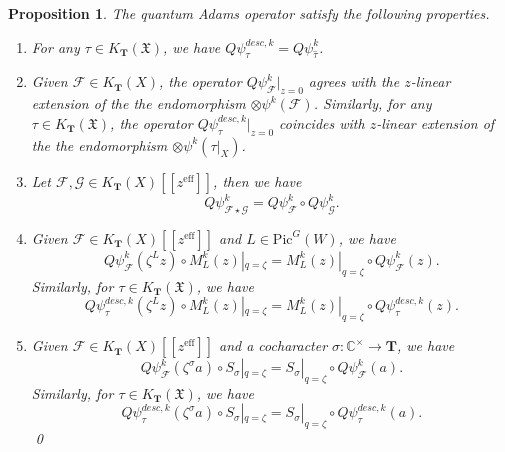 \documentclass[reqno]{amsart}
\numberwithin{equation}{section}
\numberwithin{equation}{section}
\numberwithin{equation}{section}
\newtheorem{prop}[thm]{Proposition}
\theoremstyle{definition}
\theoremstyle{remark}
\theoremstyle{remark}
\begin{document}
\begin{prop}\label{prop:adams-property}
     The quantum Adams operator satisfy the following properties.
    \begin{enumerate}
        \item For any $\tau \in K_{\mathbf{T}}(\mathfrak{X})$, we have $Q\psi_{\tau}^{desc,k} = Q\psi_{\hat{\tau}}^k$.
        \item Given $\mathcal{F} \in K_{\mathbf{T}}(X)$, the operator $Q\psi_{\mathcal{F}}^k|_{z=0}$ agrees with the $z$-linear extension of the the endomorphism $\otimes \psi^k(\mathcal{F})$. Similarly, for any $\tau \in K_{\mathbf{T}}(\mathfrak{X})$, the operator $Q\psi_{\tau}^{desc,k}|_{z=0}$ coincides with $z$-linear extension of the the endomorphism $\otimes \psi^k(\tau |_{X})$.
        \item Let $\mathcal{F}, \mathcal{G} \in K_{\mathbf{T}}(X)[\![ z^{\mathrm{eff}} ]\!]$, then we have
        \begin{equation}
        Q\psi^k_{\mathcal{F} \star \mathcal{G}} = Q\psi^k_{\mathcal{F}} \circ Q\psi^k_{\mathcal{G}}.
        \end{equation}
        \item Given $\mathcal{F} \in K_{\mathbf{T}}(X)[\![ z^{\mathrm{eff}} ]\!]$ and $L \in \mathrm{Pic}^G(W)$, we have
        \begin{equation}
            Q\psi^k_{\mathcal{F}}(\zeta^L z) \circ M_L^k(z)|_{q=\zeta} = M^k_L(z) |_{q=\zeta} \circ Q\psi^k_{\mathcal{F}}(z).
        \end{equation}
        Similarly, for $\tau \in K_{\mathbf{T}}(\mathfrak{X})$, we have
        \begin{equation}
            Q\psi_{\tau}^{desc,k}(\zeta^L z) \circ M_L^k(z)|_{q=\zeta} = M_L^k(z)|_{q=\zeta} \circ Q\psi_{\tau}^{desc,k}(z).
        \end{equation}
        \item Given $\mathcal{F} \in K_{\mathbf{T}}(X)[\![ z^{\mathrm{eff}} ]\!]$ and a cocharacter $\sigma: \mathbb{C}^{\times} \to \mathbf{T}$, we have
        \begin{equation}
            Q\psi^k_{\mathcal{F}}(\zeta^{\sigma} a) \circ S_{\sigma}|_{q=\zeta} = S_{\sigma}|_{q=\zeta} \circ Q\psi^k_{\mathcal{F}}(a).
        \end{equation}
        Similarly, for $\tau \in K_{\mathbf{T}}(\mathfrak{X})$, we have
        \begin{equation}
            Q\psi^{desc,k}_{\tau}(\zeta^{\sigma} a) \circ S_{\sigma}|_{q=\zeta} = S_{\sigma}|_{q=\zeta} \circ Q\psi^{desc,k}_{\tau}(a).
        \end{equation}
        \qed
    \end{enumerate}
\end{prop}
\end{document}
